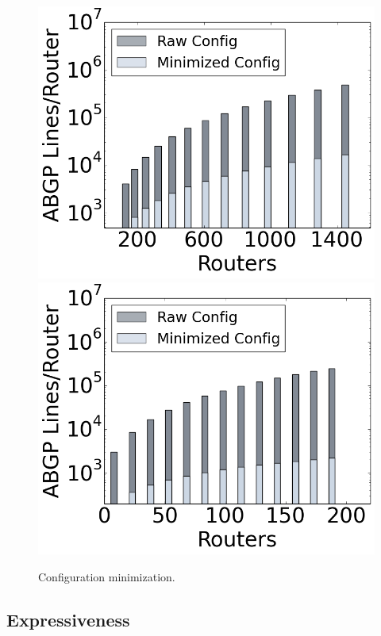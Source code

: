 \documentclass{sig-alternate-10pt}
\providecommand{\DIFaddbegin}{} %
\providecommand{\DIFaddend}{} %
\providecommand{\DIFdelbegin}{} %
\providecommand{\DIFdelend}{} %
\begin{document}
\DIFdelbegin %
\DIFdelend \DIFaddbegin \begin{figure}[t!]
    {\includegraphics[width=.49\columnwidth]{figures/config-compression-dc.png}}
    {\includegraphics[width=.49\columnwidth]{figures/config-compression-backbone.png}} \\
  \caption{Configuration minimization. \label{fig:config-min}}
  \vspace{-1em}
\end{figure}
\DIFaddend 

\subsection{Expressiveness}
\end{document}
